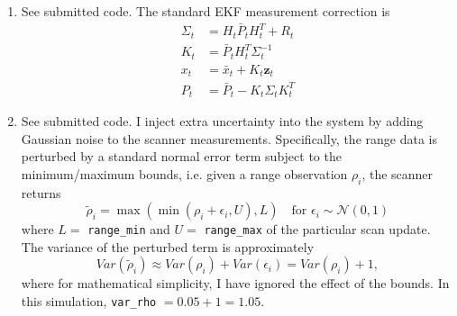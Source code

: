 \documentclass[12pt]{article}
\begin{document}
\begin{enumerate}
\[\begin{array}{c}
			\vdots \\
			H_t^K
		\end{array}\right).
	\]
	\item See submitted code. The standard EKF measurement correction is
	\begin{align*}
		\Sigma_t &= H_t \bar P_t H_t^T + R_t \\
		K_t &= \bar P_t H_t^T \Sigma_t^{-1} \\
		x_t &= \bar x_t + K_t \mathbf{z}_t \\
		P_t &= \bar P_t - K_t \Sigma_t K_t^T
	\end{align*}
	\item See submitted code. I inject extra uncertainty into the system by adding Gaussian noise to the scanner measurements. Specifically, the range data is perturbed by a standard normal error term subject to the minimum/maximum bounds, i.e. given a range observation $\rho_i$, the scanner returns
	\[
		\tilde \rho_i = \max(\min(\rho_i + \epsilon_i, U), L) \quad \mbox{for } \epsilon_i \sim \mathcal{N}(0,1)
	\]
	where $L =$ \verb|range_min| and $U =$ \verb|range_max| of the particular scan update. The variance of the perturbed term is approximately
	\[
		Var(\tilde \rho_i) \approx Var(\rho_i) + Var(\epsilon_i) = Var(\rho_i) + 1,
	\]
	where for mathematical simplicity, I have ignored the effect of the bounds. In this simulation, \verb|var_rho| $= 0.05 + 1 = 1.05$.
\end{enumerate}
\end{document}
